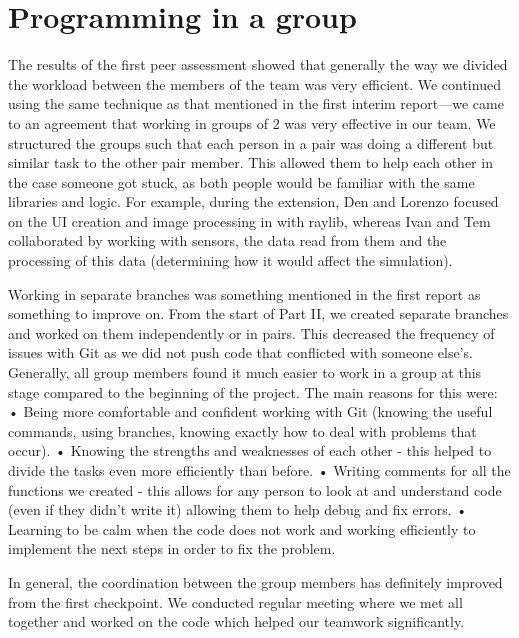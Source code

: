 \documentclass[11pt, oneside, UKenglish]{article}
\begin{document}
\section{Programming in a group}
The results of the first peer assessment showed that generally the way we divided the workload between the members of the team was very efficient.
We continued using the same technique as that mentioned in the first interim report---we came to an agreement that working in groups of 2 was very effective in our team. We structured the groups such that each person in a pair was doing a different but similar task to the other pair member.
This allowed them to help each other in the case someone got stuck, as both people would be familiar with the same libraries and logic.
For example, during the extension, Den and Lorenzo focused on the UI creation and image processing in with raylib, whereas Ivan and Tem collaborated by working with sensors, the data read from them and the processing of this data (determining how it would affect the simulation).

Working in separate branches was something mentioned in the first report as something to improve on.
From the start of Part II, we created separate branches and worked on them independently or in pairs.
This decreased the frequency of issues with Git as we did not push code that conflicted with someone else's.
Generally, all group members found it much easier to work in a group at this stage compared to the beginning of the project. The main reasons for this were: 
\newline • Being more comfortable and confident working with Git (knowing the useful commands, using branches, knowing exactly how to deal with problems that occur).
\newline • Knowing the strengths and weaknesses of each other - this helped to divide the tasks even more efficiently than before.
\newline • Writing comments for all the functions we created - this allows for any person to look at and understand code (even if they didn't write it) allowing them to help debug and fix errors.
\newline • Learning to be calm when the code does not work and working efficiently to implement the next steps in order to fix the problem.

In general, the coordination between the group members has definitely improved from the first checkpoint.
We conducted regular meeting where we met all together and worked on the code which helped our teamwork significantly. 
\end{document}
